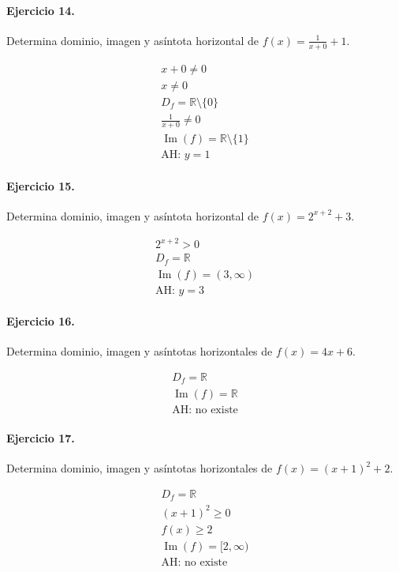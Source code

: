 \documentclass[11pt,a4paper]{article}
\begin{document}
\paragraph{Ejercicio 14.} Determina dominio, imagen y asíntota horizontal de $f(x)=\frac{1}{x+0}+1$.

\[
\begin{aligned}
x+0\ne0\\
x\ne 0\\
D_f=\mathbb{R}\setminus\{0\}\\
\frac{1}{x+0}\ne0\\
\operatorname{Im}(f)=\mathbb{R}\setminus\{1\}\\
\text{AH: }y=1
\end{aligned}
\]


\paragraph{Ejercicio 15.} Determina dominio, imagen y asíntota horizontal de $f(x)=2^{x+2}+3$.

\[
\begin{aligned}
2^{x+2}>0\\
D_f=\mathbb{R}\\
\operatorname{Im}(f)=(3,\infty)\\
\text{AH: }y=3
\end{aligned}
\]


\paragraph{Ejercicio 16.} Determina dominio, imagen y asíntotas horizontales de $f(x)=4x+6$.

\[
\begin{aligned}
D_f=\mathbb{R}\\
\operatorname{Im}(f)=\mathbb{R}\\
\text{{AH: no existe}}
\end{aligned}
\]


\paragraph{Ejercicio 17.} Determina dominio, imagen y asíntotas horizontales de $f(x)=(x+1)^2+2$.

\[
\begin{aligned}
D_f=\mathbb{R}\\
(x+1)^2\ge 0\\
f(x)\ge 2\\
\operatorname{Im}(f)=[2,\infty)\\
\text{{AH: no existe}}
\end{aligned}
\]
\end{document}
